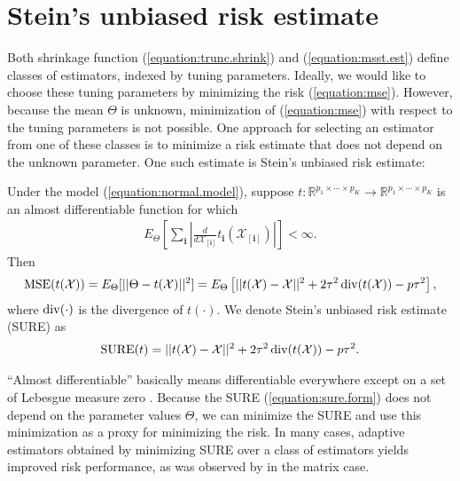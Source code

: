 \section{Stein's unbiased risk estimate}
\label{sec:sure_form}

Both shrinkage function (\ref{equation:trunc.shrink}) and (\ref{equation:msst.est}) define classes of estimators, indexed by tuning parameters.  Ideally, we would like to choose these tuning parameters by minimizing the risk (\ref{equation:mse}). However, because the mean $\Theta$ is unknown, minimization of (\ref{equation:mse}) with respect to the tuning parameters is not possible. One approach for selecting an estimator from one of these classes is to minimize a risk estimate that does not depend on the unknown parameter. One such estimate is Stein's unbiased risk estimate:
\begin{theorem}
\label{theorem:stein.theorem}
  Under the model (\ref{equation:normal.model}), suppose $t: \mathbb{R}^{p_1\times\cdots\times p_K} \rightarrow \mathbb{R}^{p_1\times\cdots\times p_K}$ is an almost differentiable function for which
\begin{align}
\label{equation:int.condition}
E_{\Theta}\left[\sum_{\mathbf{i}} \left|\frac{d}{d\mathcal{X}_{[\mathbf{i}]}}t_{\mathbf{i}}(\mathcal{X}_{[\mathbf{i}]})\right|\right] < \infty.
\end{align}
Then
\begin{align*}
\operatorname*{MSE}(t(\mathcal{X})) = E_{\Theta}[||\Theta - t(\mathcal{X})||^2] = E_{\Theta}\left[ ||t(\mathcal{X}) - \mathcal{X}||^2 + 2\tau^2\operatorname*{div}(t(\mathcal{X})) - p\tau^2\right],
\end{align*}
where $\operatorname*{div}(\cdot)$ is the divergence of $t(\cdot)$. We denote Stein's unbiased risk estimate (SURE) as 
\begin{align}
\label{equation:sure.form}
\operatorname*{SURE}(t) = ||t(\mathcal{X}) - \mathcal{X}||^2 + 2\tau^2\operatorname*{div}(t(\mathcal{X})) - p\tau^2.
\end{align}
\end{theorem}

``Almost differentiable'' basically means differentiable everywhere except on a set of Lebesgue measure zero \citep[Definition 1]{stein1981estimation}. Because the SURE (\ref{equation:sure.form}) does not depend on the parameter values $\Theta$, we can minimize the SURE and use this minimization as a proxy for minimizing the risk. In many cases, adaptive estimators obtained by minimizing SURE over a class of estimators yields improved risk performance, as was observed by \cite{candes2013unbiased} in the matrix case.


